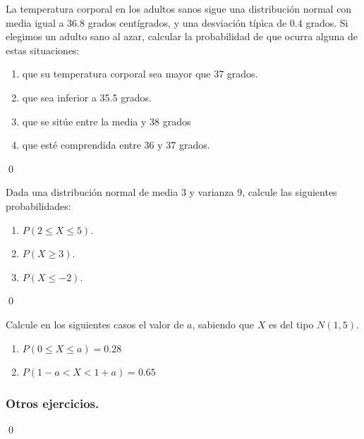 \documentclass[10pt,a4paper]{article}\usepackage[]{graphicx}\usepackage[]{color}
\begin{document}
\begin{ejercicio}
\label{tut05:ejercicio47}
La temperatura corporal en los adultos sanos sigue una distribución normal con media igual a $36.8$ grados centígrados, y una desviación típìca de $0.4$ grados. Si elegimos un adulto sano al azar, calcular la probabilidad de que ocurra alguna de estas situaciones:
        \begin{enumerate}
            \item que su temperatura corporal sea mayor que 37 grados.
            \item que sea inferior a 35.5 grados.
            \item que se sitúe entre la media  y $38$ grados
            \item que esté comprendida entre $36$ y $37$ grados.
        \end{enumerate}

\qed\end{ejercicio}
\begin{ejercicio}
\label{tut05:ejercicio48}
Dada una distribución normal de media 3 y varianza 9, calcule las siguientes probabilidades:
    \begin{enumerate}
        \item $P(2\leq X \leq5)$.
        \item $P(X \geq 3)$.
        \item $P(X \leq -2)$.
    \end{enumerate}


\qed\end{ejercicio}
\begin{ejercicio}
\label{tut05:ejercicio49}
Calcule en los siguientes casos el valor de $a$, sabiendo que $X$ es del tipo $N(1,5)$.
      \begin{enumerate}
        \item $P(0\leq X \leq a) = 0.28$
        \item $P(1 - a<X<1 + a) = 0.65$
      \end{enumerate}


\subsubsection*{Otros ejercicios.}

\qed\end{ejercicio}
\end{document}

